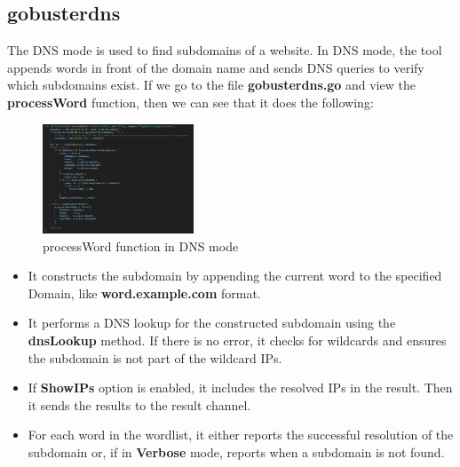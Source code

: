 \documentclass[12 pt]{article}
\begin{document}
\subsection{gobusterdns}
The DNS mode is used to find subdomains of a website. In DNS mode,
the tool appends words in front of the domain name and sends DNS queries to verify which subdomains exist. If we go to the file \textbf{gobusterdns.go} and view the \textbf{processWord} function, then we can see that it does the following:
\begin{figure}[H]
    \centering
    \includegraphics[width=0.4\textwidth]{Gobusterdns_ProcessWord.png}
    \caption{processWord function in DNS mode}
    \label{fig: Gobusterdns processWord}
\end{figure}
\begin{itemize}
    \item It constructs the subdomain by appending the current word to the specified Domain, like \textbf{word.example.com} format.
    \item It performs a DNS lookup for the constructed subdomain using the \textbf{dnsLookup} method. If there is no error, it checks for wildcards and ensures the subdomain is not part of the wildcard IPs.
    \item If \textbf{ShowIPs} option is enabled, it includes the resolved IPs in the result. Then it sends the results to the result channel.
    \item For each word in the wordlist, it either reports the successful resolution of the subdomain or, if in \textbf{Verbose} mode, reports when a subdomain is not found.
\end{itemize}
\end{document}
